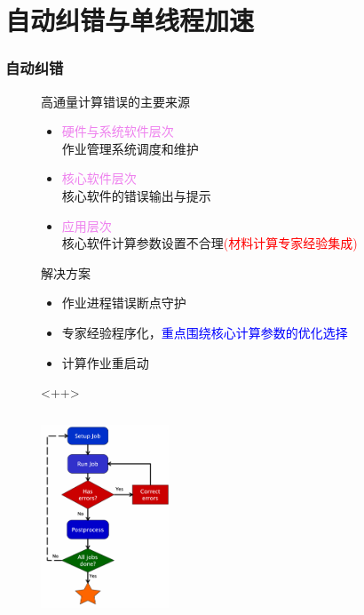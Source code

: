 \documentclass[cjk,slidestop,handout,compress,mathserif,blue]{beamer}	%
\begin{document}
\section{自动纠错与单线程加速}
%
\frame
{
	\frametitle{自动纠错}
		\begin{figure}[h!]
			\begin{minipage}[t]{0.50\linewidth}
		高通量计算错误的主要来源
\begin{itemize}
	\item \textcolor{violet}{硬件与系统软件层次}\\
		作业管理系统调度和维护
	\item \textcolor{violet}{核心软件层次}\\
		核心软件的错误输出与提示
	\item \textcolor{violet}{应用层次}\\
		核心软件计算参数设置不合理\textcolor{red}{(材料计算专家经验集成)}
\end{itemize}
		解决方案
		\begin{itemize}
			\item 作业进程错误断点守护
			\item 专家经验程序化，\textcolor{blue}{重点围绕核心计算参数的优化选择}
			\item 计算作业重启动
		\end{itemize}<++>
			\end{minipage}
			\hfill
			\begin{minipage}[t]{0.45\linewidth}
				\centering
				\vspace*{-0.3in}
				\includegraphics[height=2.4in,width=1.5in,viewport=0 0 350 520,clip]{Figures/MP_custodian.png}
				\caption{\fontsize{7.2pt}{4.2pt}}%
				\label{MP_custodian}
			\end{minipage}
		\end{figure} 
}
\end{document}
